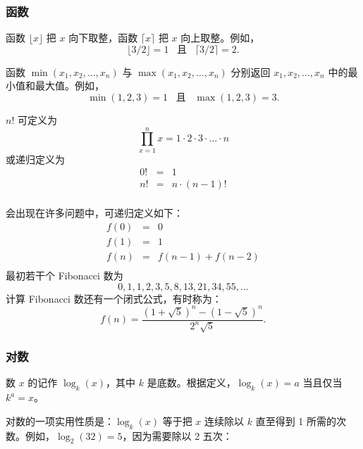 \subsubsection{函数}

函数 $\lfloor x \rfloor$ 把 $x$ 向下取整，函数 $\lceil x \rceil$ 把 $x$ 向上取整。例如，
\[ \lfloor 3/2 \rfloor = 1 \hspace{10pt} \textrm{且} \hspace{10pt} \lceil 3/2 \rceil = 2.\]

函数 $\min(x_1,x_2,\ldots,x_n)$ 与 $\max(x_1,x_2,\ldots,x_n)$ 分别返回 $x_1,x_2,\ldots,x_n$ 中的最小值和最大值。例如，
\[ \min(1,2,3)=1 \hspace{10pt} \textrm{且} \hspace{10pt} \max(1,2,3)=3.\]


 $n!$ 可定义为
\[\prod_{x=1}^n x = 1 \cdot 2 \cdot 3 \cdot \ldots \cdot n\]
或递归定义为
\[
\begin{array}{lcl}
0! & = & 1 \\
n! & = & n \cdot (n-1)! \\
\end{array}
\]


会出现在许多问题中，可递归定义如下：
\[
\begin{array}{lcl}
f(0) & = & 0 \\
f(1) & = & 1 \\
f(n) & = & f(n-1)+f(n-2) \\
\end{array}
\]
最初若干个 Fibonacci 数为
\[0, 1, 1, 2, 3, 5, 8, 13, 21, 34, 55, \ldots\]
计算 Fibonacci 数还有一个闭式公式，有时称为：
\[f(n)=\frac{(1 + \sqrt{5})^n - (1-\sqrt{5})^n}{2^n \sqrt{5}}.\]

\subsubsection{对数}


数 $x$ 的记作 $\log_k(x)$，其中 $k$ 是底数。根据定义，$\log_k(x)=a$ 当且仅当 $k^a=x$。

对数的一项实用性质是：$\log_k(x)$ 等于把 $x$ 连续除以 $k$ 直至得到 1 所需的次数。例如，$\log_2(32)=5$，因为需要除以 2 五次：

